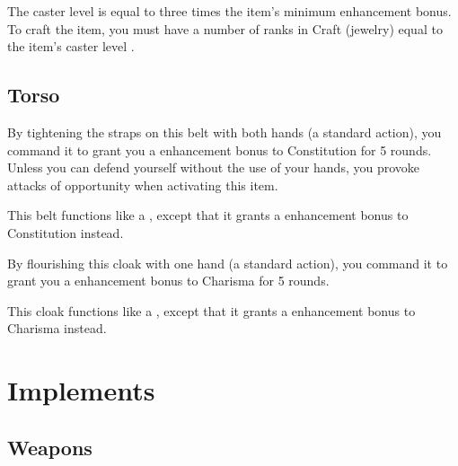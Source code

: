 The caster level is equal to three times the item's minimum enhancement bonus. To craft the item, you must have a number of ranks in Craft (jewelry) equal to the item's caster level .


\subsection{Torso}

 By tightening the straps on this belt with both hands (a standard action), you command it to grant you a  enhancement bonus to Constitution for 5 rounds. Unless you can defend yourself without the use of your hands, you provoke attacks of opportunity when activating this item.


 This belt functions like a , except that it grants a  enhancement bonus to Constitution instead.


 By flourishing this cloak with one hand (a standard action), you command it to grant you a  enhancement bonus to Charisma for 5 rounds.


 This cloak functions like a , except that it grants a  enhancement bonus to Charisma instead.


\section{Implements}

\subsection{Weapons}

